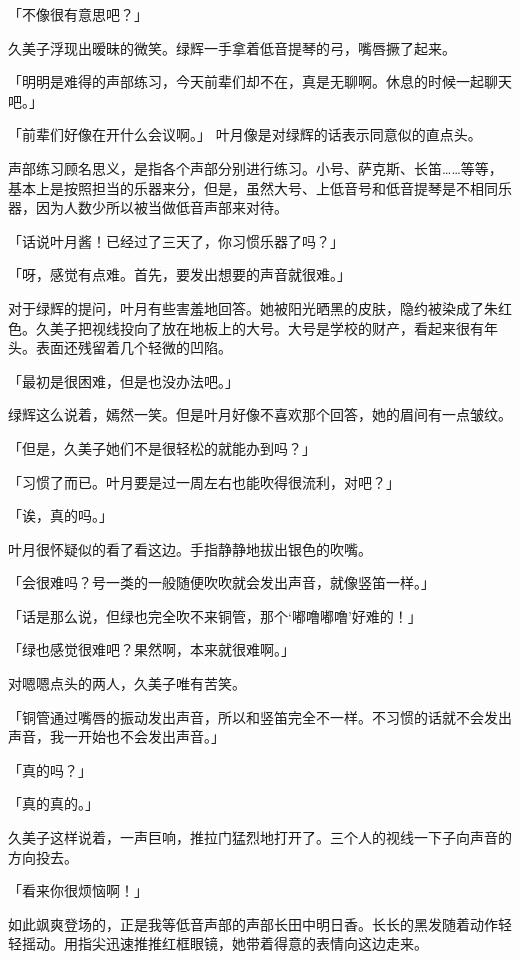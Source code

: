 \documentclass[UTF8]{ctexart}
\begin{document}
    「不像很有意思吧？」

    久美子浮现出暧昧的微笑。绿辉一手拿着低音提琴的弓，嘴唇撅了起来。

    「明明是难得的声部练习，今天前辈们却不在，真是无聊啊。休息的时候一起聊天吧。」

    「前辈们好像在开什么会议啊。」 叶月像是对绿辉的话表示同意似的直点头。

    声部练习顾名思义，是指各个声部分别进行练习。小号、萨克斯、长笛……等等，基本上是按照担当的乐器来分，但是，虽然大号、上低音号和低音提琴是不相同乐器，因为人数少所以被当做低音声部来对待。

    「话说叶月酱！已经过了三天了，你习惯乐器了吗？」

    「呀，感觉有点难。首先，要发出想要的声音就很难。」

    对于绿辉的提问，叶月有些害羞地回答。她被阳光晒黑的皮肤，隐约被染成了朱红色。久美子把视线投向了放在地板上的大号。大号是学校的财产，看起来很有年头。表面还残留着几个轻微的凹陷。

    「最初是很困难，但是也没办法吧。」

    绿辉这么说着，嫣然一笑。但是叶月好像不喜欢那个回答，她的眉间有一点皱纹。

    「但是，久美子她们不是很轻松的就能办到吗？」

    「习惯了而已。叶月要是过一周左右也能吹得很流利，对吧？」

    「诶，真的吗。」

    叶月很怀疑似的看了看这边。手指静静地拔出银色的吹嘴。

    「会很难吗？号一类的一般随便吹吹就会发出声音，就像竖笛一样。」

    「话是那么说，但绿也完全吹不来铜管，那个‘嘟噜嘟噜’好难的！」

    「绿也感觉很难吧？果然啊，本来就很难啊。」

    对嗯嗯点头的两人，久美子唯有苦笑。

    「铜管通过嘴唇的振动发出声音，所以和竖笛完全不一样。不习惯的话就不会发出声音，我一开始也不会发出声音。」

    「真的吗？」

    「真的真的。」

    久美子这样说着，一声巨响，推拉门猛烈地打开了。三个人的视线一下子向声音的方向投去。

    「看来你很烦恼啊！」

    如此飒爽登场的，正是我等低音声部的声部长田中明日香。长长的黑发随着动作轻轻摇动。用指尖迅速推推红框眼镜，她带着得意的表情向这边走来。
\end{document}
